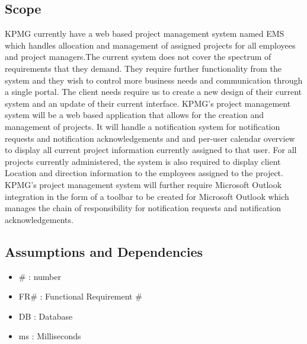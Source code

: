 \documentclass[a4paper,12pt]{article}
\begin{document}
  \subsection{Scope}
      \begin{flushleft}
        KPMG currently have a web based project management system named EMS which handles allocation and management of assigned projects for all employees and project managers.The current system does not cover the spectrum of requirements that they demand. They require further functionality from the system and they wish to control more business needs and communication through a single portal. The client needs require us to create a new design of their current system and an update of their current interface.
        \linebreak
        \linebreak
        KPMG's project management system will be a web based application that allows for the creation and management of projects. It will handle a notification system for notification requests and notification acknowledgements and and per-user calendar overview to display all current project information currently assigned to that user. For all projects currently administered, the system is also required to display client Location and direction information to the employees assigned to the project.
        \linebreak
        \linebreak
        KPMG's project management system will further require Microsoft Outlook integration in the form of a toolbar to be created for Microsoft Outlook which manages the chain of responsibility for notification requests and notification acknowledgements.
      \end{flushleft}
      
    \subsection{Assumptions and Dependencies}
      \begin{itemize}
          \item \# :  number
          \item FR# : Functional Requirement #
          \item DB : Database
          \item ms : Milliseconds 
      \end{itemize} 
      
      \newpage
\end{document}
